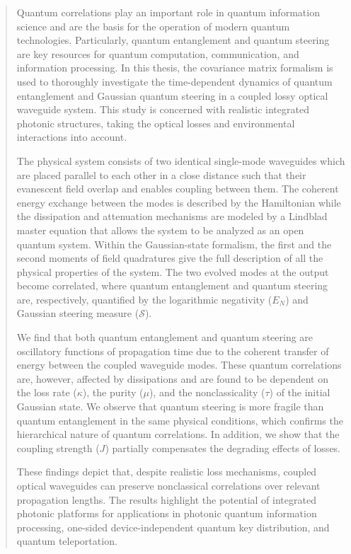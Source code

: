 \documentclass[12pt,a4paper]{report}
\begin{document}
\newpage
\begin{abstract}
	
	Quantum correlations play an important role in quantum information science and are the basis for the operation of modern quantum technologies. Particularly, quantum entanglement and quantum steering are key resources for quantum computation, communication, and information processing. In this thesis, the covariance matrix formalism is used to thoroughly investigate the time-dependent dynamics of quantum entanglement and Gaussian quantum steering in a coupled lossy optical waveguide system. This study is concerned with realistic integrated photonic structures, taking the optical losses and environmental interactions into account.
	
    The physical system consists of two identical single-mode waveguides which are placed parallel to each other in a close distance such that their evanescent field overlap and enables coupling between them. The coherent energy exchange between the modes is described by the Hamiltonian while the dissipation and attenuation mechanisms are modeled by a Lindblad master equation that allows the system to be analyzed as an open quantum system. Within the Gaussian-state formalism, the first and the second moments of field quadratures give the full description of all the physical properties of the system. The two evolved modes at the output become correlated, where quantum entanglement and quantum steering are, respectively, quantified by the logarithmic negativity ($E_N$) and Gaussian steering measure ($\mathcal{S}$).
	
	We find that both quantum entanglement and quantum steering are oscillatory functions of propagation time due to the coherent transfer of energy between the coupled waveguide modes. These quantum correlations are, however, affected by dissipations and are found to be dependent on the loss rate ($\kappa$), the purity ($\mu$), and the nonclassicality ($\tau$) of the initial Gaussian state. We observe that quantum steering is more fragile than quantum entanglement in the same physical conditions, which confirms the hierarchical nature of quantum correlations. In addition, we show that the coupling strength ($J$) partially compensates the degrading effects of losses.
	
	These findings depict that, despite realistic loss mechanisms, coupled optical waveguides can preserve nonclassical correlations over relevant propagation lengths. The results highlight the potential of integrated photonic platforms for applications in photonic quantum information processing, one-sided device-independent quantum key distribution, and quantum teleportation.

\end{abstract}
\end{document}
